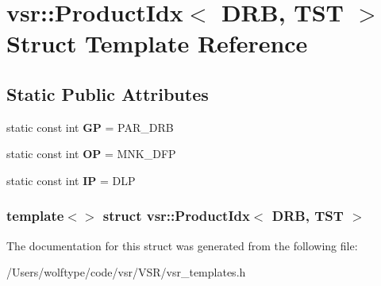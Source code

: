 \hypertarget{structvsr_1_1_product_idx_3_01_d_r_b_00_01_t_s_t_01_4}{\section{vsr\-:\-:Product\-Idx$<$ D\-R\-B, T\-S\-T $>$ Struct Template Reference}
\label{structvsr_1_1_product_idx_3_01_d_r_b_00_01_t_s_t_01_4}
}
\subsection*{Static Public Attributes}
\begin{DoxyCompactItemize}
\item 
\hypertarget{structvsr_1_1_product_idx_3_01_d_r_b_00_01_t_s_t_01_4_a7961627fb98147b71bc2e89a7736e48a}{static const int {\bfseries G\-P} = P\-A\-R\-\_\-\-D\-R\-B}\label{structvsr_1_1_product_idx_3_01_d_r_b_00_01_t_s_t_01_4_a7961627fb98147b71bc2e89a7736e48a}

\item 
\hypertarget{structvsr_1_1_product_idx_3_01_d_r_b_00_01_t_s_t_01_4_aea14bcdb346f5081814c9db1bbe2c63f}{static const int {\bfseries O\-P} = M\-N\-K\-\_\-\-D\-F\-P}\label{structvsr_1_1_product_idx_3_01_d_r_b_00_01_t_s_t_01_4_aea14bcdb346f5081814c9db1bbe2c63f}

\item 
\hypertarget{structvsr_1_1_product_idx_3_01_d_r_b_00_01_t_s_t_01_4_a39869fc1d6b254e228ff75eb37c69f90}{static const int {\bfseries I\-P} = D\-L\-P}\label{structvsr_1_1_product_idx_3_01_d_r_b_00_01_t_s_t_01_4_a39869fc1d6b254e228ff75eb37c69f90}

\end{DoxyCompactItemize}
\subsubsection*{template$<$$>$ struct vsr\-::\-Product\-Idx$<$ D\-R\-B, T\-S\-T $>$}



The documentation for this struct was generated from the following file\-:\begin{DoxyCompactItemize}
\item 
/\-Users/wolftype/code/vsr/\-V\-S\-R/vsr\-\_\-templates.\-h\end{DoxyCompactItemize}
